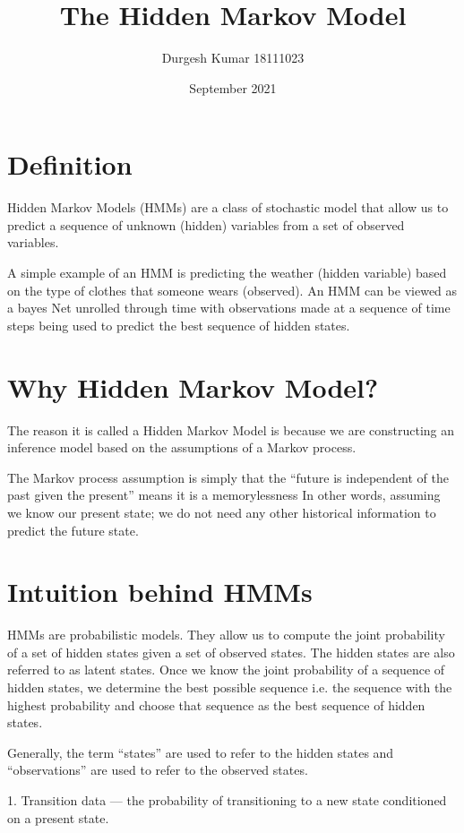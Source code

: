 \documentclass{article}
\title{The Hidden Markov Model}
\author{Durgesh Kumar 18111023}
\date{September 2021}
\begin{document}
\maketitle

\section{Definition}

Hidden Markov Models (HMMs) are a class of stochastic model that allow us to predict a sequence of unknown (hidden) variables from a set of observed variables.

A simple example of an HMM is predicting the weather (hidden variable) based on the type of clothes that someone wears (observed). An HMM can be viewed as a bayes Net unrolled through time with observations made at a sequence of time steps being used to predict the best sequence of hidden states.

\section{Why Hidden Markov Model?}

The reason it is called a Hidden Markov Model is because we are constructing an inference model based on the assumptions of a Markov process. 

The Markov process assumption is simply that the “future is independent of the past given the present” means it is a memorylessness In other words, assuming we know our present state; we do not need any other historical information to predict the future state.

\section{Intuition behind HMMs}

HMMs are probabilistic models. They allow us to compute the joint probability of a set of hidden states given a set of observed states. The hidden states are also referred to as latent states. Once we know the joint probability of a sequence of hidden states, we determine the best possible sequence i.e. the sequence with the highest probability and choose that sequence as the best sequence of hidden states.

Generally, the term “states” are used to refer to the hidden states and “observations” are used to refer to the observed states.

1.	Transition data — the probability of transitioning to a new state conditioned on a present state.
\end{document}

